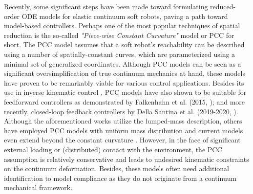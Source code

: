 Recently, some significant steps have been made toward formulating reduced-order ODE models for elastic continuum soft robots, paving a path toward model-based controllers. Perhaps one of the most popular techniques of spatial reduction is the so-called \textit{"Piece-wise Constant Curvature"} model or PCC for short. The PCC model assumes that a soft robot's reachability can be described using a number of spatially-constant curves, which are parameterized using a minimal set of generalized coordinates. Although PCC models can be seen as a significant oversimplification of true continuum mechanics at hand, these models have proven to be remarkably viable for various control applications. Besides its use in inverse kinematic control \cite{Marchese2014,Marchese2016,Jones2006}, PCC models have also shown to be suitable for feedforward controllers as demonstrated by Falkenhahn et al. (2015, \cite{Falkenhahn2015}); and more recently, closed-loop feedback controllers by Della Santina et al. (2019-2020, \cite{DellaSantina2020,Katzschmann2019}). Although the aforementioned works utilize the lumped-mass description, others have employed PCC models with uniform mass distribution \cite{Renda2018,Godage2015,Godage2016,Tatlicioglu2007,Tatlicioglu2007a} and current models even extend beyond the constant curvature \cite{Mochiyama2003,Chirikjian1994,DellaSantina2020}. However, in the face of significant external loading or (distributed) contact with the environment, the PCC assumption is relatively conservative and leads to undesired kinematic constraints on the continuum deformation. Besides, these models often need additional identification to model compliance as they do not originate from a continuum mechanical framework.

